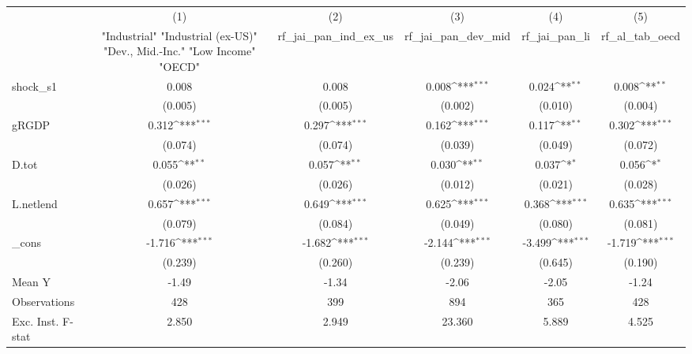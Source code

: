{
\def\sym#1{\ifmmode^{#1}\else\(^{#1}\)\fi}
\begin{tabular}{l*{5}{c}}
\toprule
            &\multicolumn{1}{c}{(1)}&\multicolumn{1}{c}{(2)}&\multicolumn{1}{c}{(3)}&\multicolumn{1}{c}{(4)}&\multicolumn{1}{c}{(5)}\\
            &\multicolumn{1}{c}{ "Industrial" "Industrial (ex-US)" "Dev., Mid.-Inc." "Low Income" "OECD" }&\multicolumn{1}{c}{rf\_jai\_pan\_ind\_ex\_us}&\multicolumn{1}{c}{rf\_jai\_pan\_dev\_mid}&\multicolumn{1}{c}{rf\_jai\_pan\_li}&\multicolumn{1}{c}{rf\_al\_tab\_oecd}\\
\midrule
shock\_s1    &       0.008         &       0.008         &       0.008\sym{***}&       0.024\sym{**} &       0.008\sym{**} \\
            &     (0.005)         &     (0.005)         &     (0.002)         &     (0.010)         &     (0.004)         \\
\addlinespace
gRGDP       &       0.312\sym{***}&       0.297\sym{***}&       0.162\sym{***}&       0.117\sym{**} &       0.302\sym{***}\\
            &     (0.074)         &     (0.074)         &     (0.039)         &     (0.049)         &     (0.072)         \\
\addlinespace
D.tot       &       0.055\sym{**} &       0.057\sym{**} &       0.030\sym{**} &       0.037\sym{*}  &       0.056\sym{*}  \\
            &     (0.026)         &     (0.026)         &     (0.012)         &     (0.021)         &     (0.028)         \\
\addlinespace
L.netlend   &       0.657\sym{***}&       0.649\sym{***}&       0.625\sym{***}&       0.368\sym{***}&       0.635\sym{***}\\
            &     (0.079)         &     (0.084)         &     (0.049)         &     (0.080)         &     (0.081)         \\
\addlinespace
\_cons      &      -1.716\sym{***}&      -1.682\sym{***}&      -2.144\sym{***}&      -3.499\sym{***}&      -1.719\sym{***}\\
            &     (0.239)         &     (0.260)         &     (0.239)         &     (0.645)         &     (0.190)         \\
\midrule
Mean Y      &       -1.49         &       -1.34         &       -2.06         &       -2.05         &       -1.24         \\
Observations&         428         &         399         &         894         &         365         &         428         \\
Exc. Inst. F-stat&       2.850         &       2.949         &      23.360         &       5.889         &       4.525         \\
\bottomrule
\end{tabular}
}
